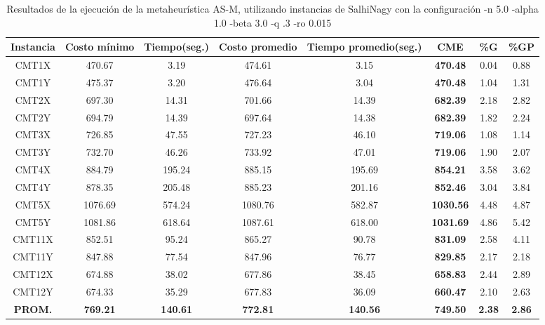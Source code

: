 \begin{table}[h]
\caption{Resultados de la ejecución de la metaheurística AS-M, utilizando instancias de SalhiNagy con la configuración -n 5.0 -alpha 1.0 -beta 3.0 -q .3 -ro 0.015}
\centering
\small
\begin{tabular}{c c c c c c c c}
\hline\hline
Instancia & Costo mínimo & Tiempo(seg.) & Costo promedio & Tiempo promedio(seg.) & CME & \%G & \%GP \\ [0.5ex]
\hline
CMT1X & 470.67 & 3.19 & 
474.61 & 3.15 & \bf{470.48} & 
0.04 & 0.88\\CMT1Y & 475.37 & 3.20 & 
476.64 & 3.04 & \bf{470.48} & 
1.04 & 1.31\\CMT2X & 697.30 & 14.31 & 
701.66 & 14.39 & \bf{682.39} & 
2.18 & 2.82\\CMT2Y & 694.79 & 14.39 & 
697.64 & 14.38 & \bf{682.39} & 
1.82 & 2.24\\CMT3X & 726.85 & 47.55 & 
727.23 & 46.10 & \bf{719.06} & 
1.08 & 1.14\\CMT3Y & 732.70 & 46.26 & 
733.92 & 47.01 & \bf{719.06} & 
1.90 & 2.07\\CMT4X & 884.79 & 195.24 & 
885.15 & 195.69 & \bf{854.21} & 
3.58 & 3.62\\CMT4Y & 878.35 & 205.48 & 
885.23 & 201.16 & \bf{852.46} & 
3.04 & 3.84\\CMT5X & 1076.69 & 574.24 & 
1080.76 & 582.87 & \bf{1030.56} & 
4.48 & 4.87\\CMT5Y & 1081.86 & 618.64 & 
1087.61 & 618.00 & \bf{1031.69} & 
4.86 & 5.42\\CMT11X & 852.51 & 95.24 & 
865.27 & 90.78 & \bf{831.09} & 
2.58 & 4.11\\CMT11Y & 847.88 & 77.54 & 
847.96 & 76.77 & \bf{829.85} & 
2.17 & 2.18\\CMT12X & 674.88 & 38.02 & 
677.86 & 38.45 & \bf{658.83} & 
2.44 & 2.89\\CMT12Y & 674.33 & 35.29 & 
677.83 & 36.09 & \bf{660.47} & 
2.10 & 2.63\\\bf{PROM.} & 
\bf{769.21} & \bf{140.61} & \bf{772.81} & \bf{140.56} & \bf{749.50} & \bf{2.38} & \bf{2.86}\\[1ex]\hline
\end{tabular}
\label{table:nonlin}
\end{table}

